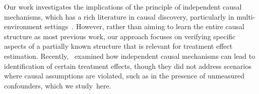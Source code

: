 Our work investigates the implications of the principle of independent causal mechanisms, which has a rich literature in causal discovery, particularly in multi-environment settings~\citep{ huang2020causal, perry2022causal,guo2024causal,mameche2024learning}. However, rather than aiming to learn the entire causal structure as most previous work, our approach focuses on verifying specific aspects of a partially known structure that is relevant for treatment effect estimation. Recently,~\citet{guo2024finetti} examined how independent causal mechanisms can lead to identification of certain treatment effects, though they did not address scenarios where causal assumptions are violated, such as in the presence of unmeasured confounders, which we study~here.